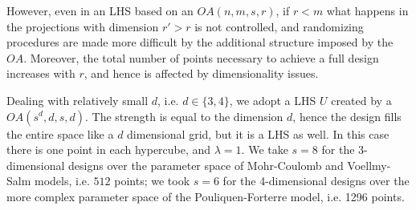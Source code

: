 \documentclass{article}
\begin{document}
However, even in an LHS based on an $OA(n,m,s,r)$, if $r<m$ what happens in the projections with dimension $r'>r$ is not controlled, and randomizing procedures are made more difficult by the additional structure imposed by the $OA$. Moreover, the total number of points necessary to achieve a full design increases with $r$, and hence is affected by dimensionality issues.

Dealing with relatively small $d$, i.e. $d\in\{3,4\}$, we adopt a LHS $U$ created by a $OA(s^d,d,s,d)$. The strength is equal to the dimension $d$, hence the design fills the entire space like a $d$ dimensional grid, but it is a LHS as well. In this case there is one point in each hypercube, and $\lambda=1$. We take $s=8$ for the 3-dimensional designs over the parameter space of Mohr-Coulomb and Voellmy-Salm models, i.e. $512$ points; we took $s=6$ for the 4-dimensional designs over the more complex parameter space of the Pouliquen-Forterre model, i.e. 1296 points.

\newpage


\end{document}
